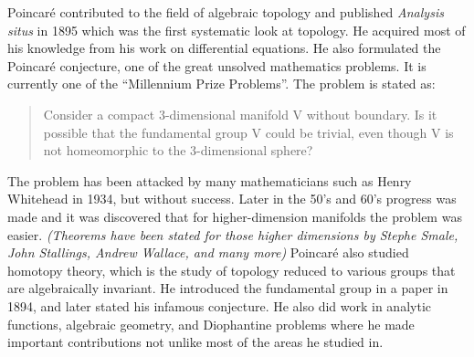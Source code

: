 \documentclass[12pt]{article}
\begin{document}
Poincar\'e contributed to the field of algebraic topology and published \emph{Analysis situs} in 1895 which was the first  systematic look at topology.  He acquired most of his knowledge from his work on differential equations.  He also formulated the Poincar\'e conjecture, one of the great unsolved mathematics problems. It is currently one of the ``Millennium Prize Problems''. The problem is stated as:
\begin{quote}
Consider a compact 3-dimensional manifold V without boundary.  Is it possible that the fundamental group V could be trivial, even though V is not homeomorphic to the 3-dimensional sphere? \cite{CMI}
\end{quote}
The problem has been attacked by many mathematicians such as Henry Whitehead in 1934, but without success.  Later in the 50's and 60's progress was made and it was discovered that for higher-dimension manifolds the problem was easier. \textsl{(Theorems have been stated for those higher dimensions by Stephe Smale, John Stallings, Andrew Wallace, and many more)} \cite{CMI}  Poincar\'e also studied homotopy theory, which is the study of topology reduced to various groups that are algebraically invariant.\cite{MT}  He introduced the fundamental group in a paper in 1894, and later stated his infamous conjecture.  He also did work in analytic functions, algebraic geometry, and Diophantine problems where he made important contributions not unlike most of the areas he studied in.
\end{document}
